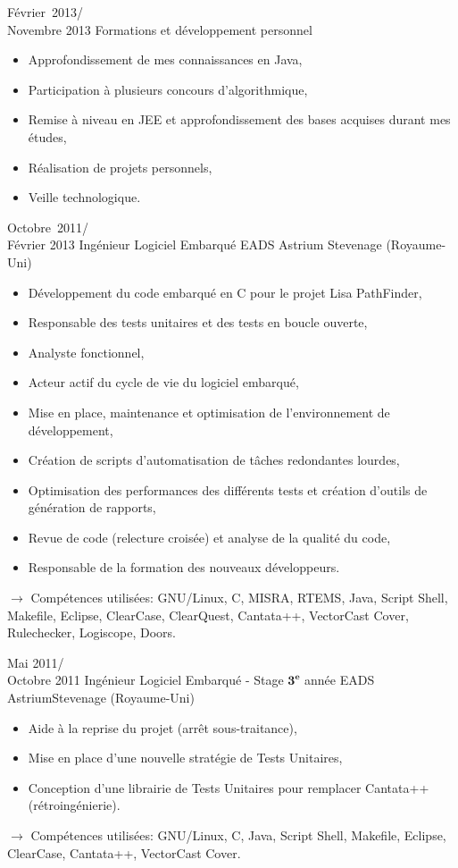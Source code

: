 \documentclass[11pt,a4paper]{moderncv}
\begin{document}
\cventry
{Février\ 2013/\\Novembre 2013}
{Formations et développement personnel}{}{}{}
{\begin{itemize}
\item Approfondissement de mes connaissances en Java,
\item Participation à plusieurs concours d'algorithmique,
\item Remise à niveau en JEE et approfondissement des bases acquises durant mes études,
\item Réalisation de projets personnels,
\item Veille technologique.
\end{itemize}
}   %

\cventry
{Octobre\ 2011/\\Février 2013}
{Ingénieur Logiciel Embarqué}
{EADS Astrium}
{Stevenage (Royaume-Uni)}
{}
{\begin{itemize}
\item Développement du code embarqué en C pour le projet Lisa PathFinder,
\item Responsable des tests unitaires et des tests en boucle ouverte,
\item Analyste fonctionnel,
\item Acteur actif du cycle de vie du logiciel embarqué,
\item Mise en place, maintenance et optimisation de l'environnement de développement,
\item Création de scripts d'automatisation de tâches redondantes lourdes,
\item Optimisation des performances des différents tests et création d'outils de génération de rapports,
\item Revue de code (relecture croisée) et analyse de la qualité du code,
\item Responsable de la formation des nouveaux développeurs.
\end{itemize}
$\rightarrow$ Compétences utilisées: GNU/Linux, C, MISRA, RTEMS, Java, Script Shell, Makefile, Eclipse, ClearCase, ClearQuest, Cantata++, VectorCast Cover, Rulechecker, Logiscope, Doors.
}   %

\cventry
{Mai 2011/\\Octobre 2011}
{Ingénieur Logiciel Embarqué - Stage $\mathbf{3^{e}}$ année}
{EADS Astrium}{Stevenage (Royaume-Uni)}
{}
{\begin{itemize}
\item Aide à la reprise du projet (arrêt sous-traitance),
\item Mise en place d'une nouvelle stratégie de Tests Unitaires,
\item Conception d'une librairie de Tests Unitaires pour remplacer Cantata++ (rétroingénierie).
\end{itemize}
$\rightarrow$ Compétences utilisées: GNU/Linux, C, Java, Script Shell, Makefile, Eclipse, ClearCase, Cantata++, VectorCast Cover.
}   %
\end{document}
